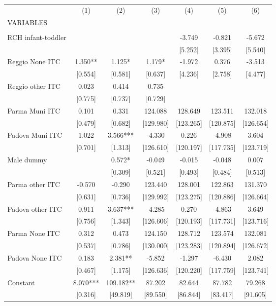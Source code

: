 \begin{tabular}{lcccccc} \hline
 & (1) & (2) & (3) & (4) & (5) & (6) \\
VARIABLES &  &  &  &  &  &  \\ \hline
 &  &  &  &  &  &  \\
RCH infant-toddler &  &  &  & -3.749 & -0.821 & -5.672 \\
 &  &  &  & [5.252] & [3.395] & [5.540] \\
Reggio None ITC & 1.350** & 1.125* & 1.179* & -1.972 & 0.376 & -3.513 \\
 & [0.554] & [0.581] & [0.637] & [4.236] & [2.758] & [4.477] \\
Reggio other ITC & 0.023 & 0.414 & 0.735 &  &  &  \\
 & [0.775] & [0.737] & [0.729] &  &  &  \\
Parma Muni ITC & 0.101 & 0.331 & 124.088 & 128.649 & 123.511 & 132.018 \\
 & [0.479] & [0.682] & [129.980] & [123.265] & [120.875] & [126.654] \\
Padova Muni ITC & 1.022 & 3.566*** & -4.330 & 0.226 & -4.908 & 3.604 \\
 & [0.701] & [1.313] & [126.610] & [120.197] & [117.735] & [123.719] \\
Male dummy &  & 0.572* & -0.049 & -0.015 & -0.048 & 0.007 \\
 &  & [0.309] & [0.521] & [0.493] & [0.484] & [0.513] \\
Parma other ITC & -0.570 & -0.290 & 123.440 & 128.001 & 122.863 & 131.370 \\
 & [0.631] & [0.736] & [129.992] & [123.275] & [120.886] & [126.664] \\
Padova other ITC & 0.911 & 3.637*** & -4.285 & 0.270 & -4.863 & 3.649 \\
 & [0.756] & [1.343] & [126.606] & [120.193] & [117.731] & [123.716] \\
Parma None ITC & 0.312 & 0.473 & 124.150 & 128.712 & 123.574 & 132.081 \\
 & [0.537] & [0.786] & [130.000] & [123.283] & [120.894] & [126.672] \\
Padova None ITC & 0.183 & 2.381** & -5.852 & -1.297 & -6.430 & 2.082 \\
 & [0.467] & [1.175] & [126.636] & [120.220] & [117.759] & [123.741] \\
Constant & 8.070*** & 109.182** & 87.202 & 82.644 & 87.782 & 79.268 \\
 & [0.316] & [49.819] & [89.550] & [86.844] & [83.417] & [91.605] \\

\end{tabular}
